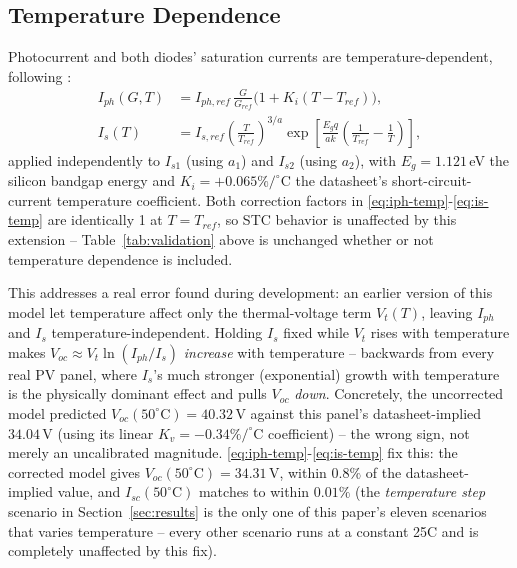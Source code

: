 \subsection{Temperature Dependence}
\label{sec:temperature-dependence}
Photocurrent and both diodes' saturation currents are temperature-dependent,
following \cite{desoto2006improvement}:
\begin{align}
I_{ph}(G,T) &= I_{ph,ref}\,\frac{G}{G_{ref}}\bigl(1 + K_i(T-T_{ref})\bigr), \label{eq:iph-temp}\\
I_{s}(T) &= I_{s,ref}\left(\frac{T}{T_{ref}}\right)^{3/a}
  \exp\!\left[\frac{E_g q}{ak}\left(\frac{1}{T_{ref}}-\frac{1}{T}\right)\right], \label{eq:is-temp}
\end{align}
applied independently to $I_{s1}$ (using $a_1$) and $I_{s2}$ (using $a_2$),
with $E_g=1.121\,$eV the silicon bandgap energy and $K_i=+0.065\%/^\circ$C
the datasheet's short-circuit-current temperature coefficient. Both
correction factors in \eqref{eq:iph-temp}-\eqref{eq:is-temp} are identically
1 at $T=T_{ref}$, so STC behavior is unaffected by this extension --
Table~\ref{tab:validation} above is unchanged whether or not temperature
dependence is included.

This addresses a real error found during development: an earlier version of
this model let temperature affect only the thermal-voltage term $V_t(T)$,
leaving $I_{ph}$ and $I_s$ temperature-independent. Holding $I_s$ fixed while
$V_t$ rises with temperature makes $V_{oc}\approx V_t\ln(I_{ph}/I_s)$
\emph{increase} with temperature -- backwards from every real PV panel,
where $I_s$'s much stronger (exponential) growth with temperature is the
physically dominant effect and pulls $V_{oc}$ \emph{down}. Concretely, the
uncorrected model predicted $V_{oc}(50^\circ\text{C})=40.32\,$V against this
panel's datasheet-implied $34.04\,$V (using its linear
$K_v=-0.34\%/^\circ$C coefficient) -- the wrong sign, not merely an
uncalibrated magnitude. \eqref{eq:iph-temp}-\eqref{eq:is-temp} fix this:
the corrected model gives $V_{oc}(50^\circ\text{C})=34.31\,$V, within
$0.8\%$ of the datasheet-implied value, and $I_{sc}(50^\circ\text{C})$
matches to within $0.01\%$ (the \emph{temperature step} scenario in
Section~\ref{sec:results} is the only one of this paper's eleven scenarios
that varies temperature -- every other scenario runs at a constant
25\textdegree C and is completely unaffected by this fix).

